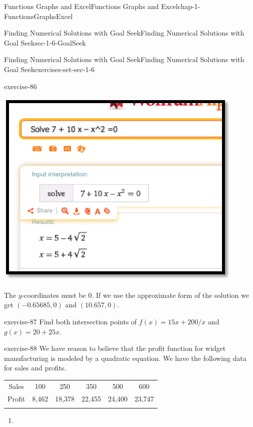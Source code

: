 \documentclass[oneside,10pt,]{book}
\numberwithin{equation}{section}
\newcommand{\hrulethin}  {\noalign{\hrule height 0.04em}}
\newcommand{\hrulemedium}{\noalign{\hrule height 0.07em}}
\newcommand{\hrulethick} {\noalign{\hrule height 0.11em}}
\begin{document}
\begin{chapterptx}{Functions Graphs and Excel}{}{Functions Graphs and Excel}{}{}{chap-1-FunctionsGraphsExcel}
\begin{sectionptx}{Finding Numerical Solutions with Goal Seek}{}{Finding Numerical Solutions with Goal Seek}{}{}{sec-1-6-GoalSeek}
\begin{exercises-subsection-numberless}{Finding Numerical Solutions with Goal Seek}{}{Finding Numerical Solutions with Goal Seek}{}{}{exercises-set-sec-1-6}
\begin{divisionexercise}{11}{}{}{exercise-86}
\begin{sidebyside}{1}{0.2}{0.2}{0}
\begin{sbspanel}{0.6}
\includegraphics[width=1\linewidth]{images/sec1-6-sol11a.png}
\end{sbspanel}%
\end{sidebyside}%
 The \(y\)-coordinates must be 0. If we use the approximate form of the solution we get \((-0.65685,0)\) and \((10.657,0)\).%
\end{divisionexercise}%
\begin{divisionexercise}{12}{}{}{exercise-87}%
\hypertarget{p-524}{}%
Find both intersection points of \(f(x) = 15 x + 200/x\) and \(g(x) = 20 + 25 x\).%
\end{divisionexercise}%
\begin{divisionexercise}{13}{}{}{exercise-88}%
\hypertarget{p-525}{}%
We have reason to believe that the profit function for widget manufacturing is modeled by a quadratic equation.  We have the following data for sales and profits.%
\begin{sidebyside}{1}{0}{0}{0}%
\begin{sbspanel}{1}%
{\centering%
\begin{tabular}{cccccc}\hrulethick
Sales&100&250&350&500&600\tabularnewline\hrulethin
Profit&\textdollar{}8,462&\textdollar{}18,378&\textdollar{}22,455&\textdollar{}24,400&\textdollar{}23,747\tabularnewline\hrulemedium
\end{tabular}
\par}
\end{sbspanel}%
\end{sidebyside}%
\leavevmode%
\begin{enumerate}[label=(\alph*)]
\item\hypertarget{li-145}{}\hypertarget{p-526}{}%

\end{enumerate}
\end{divisionexercise}
\end{exercises-subsection-numberless}
\end{sectionptx}
\end{chapterptx}
\end{document}
